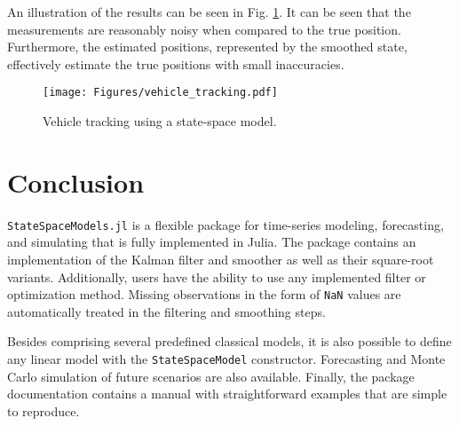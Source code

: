 \documentclass{juliacon}
\begin{document}
An illustration of the results can be seen in Fig. \ref{fig:vehicle_tracking}. It can be seen that the measurements are reasonably noisy when compared to the true position. Furthermore, the estimated positions, represented by the smoothed state, effectively estimate the true positions with small inaccuracies. 
%
\begin{figure}[h]
	\centering
	\texttt{[image: Figures/vehicle\_tracking.pdf]}
	\caption{Vehicle tracking using a state-space model.}
	\label{fig:vehicle_tracking}
\end{figure}

\section{Conclusion} \label{sec:conclusion}

\texttt{StateSpaceModels.jl} is a flexible package for time-series modeling, forecasting, and simulating that is fully implemented in Julia. The package contains an implementation of the Kalman filter and smoother as well as their square-root variants. Additionally, users have the ability to use any implemented filter or optimization method. Missing observations in the form of \texttt{NaN} values are automatically treated in the filtering and smoothing steps. 

Besides comprising several predefined classical models, it is also possible to define any linear model with the \texttt{StateSpaceModel} constructor. Forecasting and Monte Carlo simulation of future scenarios are also available. Finally, the package documentation contains a manual with straightforward examples that are simple to reproduce.


\end{document}
